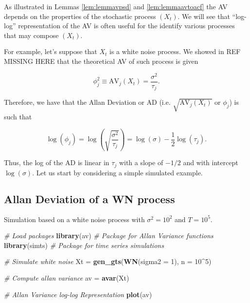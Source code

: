\documentclass[]{book}
\newenvironment{Shaded}{\begin{snugshade}}{\end{snugshade}}
\newcommand{\CommentTok}[1]{\textcolor[rgb]{0.56,0.35,0.01}{\textit{#1}}}
\newcommand{\DataTypeTok}[1]{\textcolor[rgb]{0.13,0.29,0.53}{#1}}
\newcommand{\DecValTok}[1]{\textcolor[rgb]{0.00,0.00,0.81}{#1}}
\newcommand{\KeywordTok}[1]{\textcolor[rgb]{0.13,0.29,0.53}{\textbf{#1}}}
\newcommand{\NormalTok}[1]{#1}
\newcommand{\OperatorTok}[1]{\textcolor[rgb]{0.81,0.36,0.00}{\textbf{#1}}}
\newcommand{\StringTok}[1]{\textcolor[rgb]{0.31,0.60,0.02}{#1}}
\theoremstyle{definition}
\theoremstyle{definition}
\theoremstyle{definition}
\theoremstyle{remark}
\begin{document}
As illustrated in Lemmas \ref{lem:lemmavpsd} and \ref{lem:lemmaavtoacf}
the AV depends on the properties of the stochastic process \((X_t)\). We
will see that ``log-log'' representation of the AV is often useful for
the identify various processes that may compose \((X_t)\).

For example, let's suppose that \(X_t\) is a white noise process. We
showed in REF MISSING HERE that the theoretical AV of such process is
given

\begin{equation*}
      \phi_j^2 \equiv \text{AV}_j(X_t) = \frac{\sigma^2}{\tau_j}.
\end{equation*}

Therefore, we have that the Allan Deviation or AD (i.e.
\(\sqrt{\text{AV}_j(X_t)}\) or \(\phi_j\)) is such that

\begin{equation}
       \log\left( \phi_j \right) = \log \left(\sqrt{\frac{\sigma^2}{\tau_j}}\right) = \log \left(\sigma\right) - \frac{1}{2} \log (\tau_j).
       \label{eq:av:wn}
\end{equation}

Thus, the log of the AD is linear in \(\tau_j\) with a slope of \(-1/2\)
and with intercept \(\log (\sigma)\). Let us start by considering a
simple simulated example.

\hypertarget{allan-deviation-of-a-wn-process}{%
\subsection{Allan Deviation of a WN
process}\label{allan-deviation-of-a-wn-process}}

Simulation based on a white noise process with \(\sigma^2 = 10^2\) and
\(T = 10^5\).

\begin{Shaded}
\begin{Highlighting}[]
\CommentTok{# Load packages}
\KeywordTok{library}\NormalTok{(av)      }\CommentTok{# Package for Allan Variance functions}
\KeywordTok{library}\NormalTok{(simts)   }\CommentTok{# Package for time series simulations}

\CommentTok{# Simulate white noise}
\NormalTok{Xt =}\StringTok{ }\KeywordTok{gen_gts}\NormalTok{(}\KeywordTok{WN}\NormalTok{(}\DataTypeTok{sigma2 =} \DecValTok{1}\NormalTok{), }\DataTypeTok{n =} \DecValTok{10}\OperatorTok{^}\DecValTok{5}\NormalTok{)}

\CommentTok{# Compute allan variance}
\NormalTok{av =}\StringTok{ }\KeywordTok{avar}\NormalTok{(Xt)}

\CommentTok{# Allan Variance log-log Representation}
\KeywordTok{plot}\NormalTok{(av)}
\end{Highlighting}
\end{Shaded}
\end{document}
